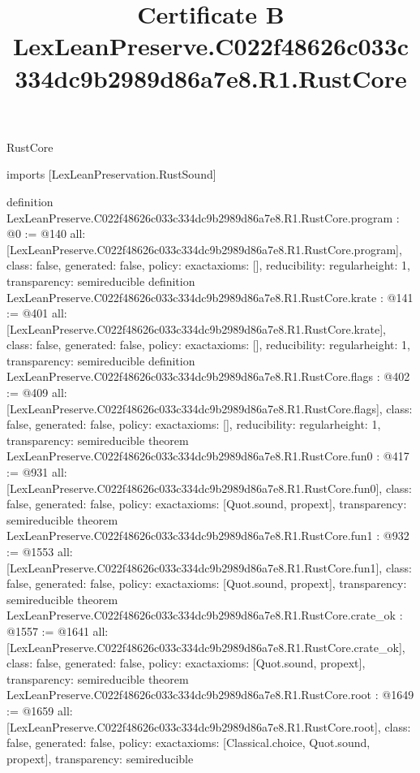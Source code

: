 \begin{lexlean}{RustCore}
\title{Certificate B LexLeanPreserve.C022f48626c033c334dc9b2989d86a7e8.R1.RustCore}
\begin{coremodule}
imports [LexLeanPreservation.RustSound]

definition LexLeanPreserve.C022f48626c033c334dc9b2989d86a7e8.R1.RustCore.program : @0 := @140 {
  all: [LexLeanPreserve.C022f48626c033c334dc9b2989d86a7e8.R1.RustCore.program],
  class: false,
  generated: false,
  policy: exact{axioms: []},
  reducibility: regular{height: 1},
  transparency: semireducible
}
definition LexLeanPreserve.C022f48626c033c334dc9b2989d86a7e8.R1.RustCore.krate : @141 := @401 {
  all: [LexLeanPreserve.C022f48626c033c334dc9b2989d86a7e8.R1.RustCore.krate],
  class: false,
  generated: false,
  policy: exact{axioms: []},
  reducibility: regular{height: 1},
  transparency: semireducible
}
definition LexLeanPreserve.C022f48626c033c334dc9b2989d86a7e8.R1.RustCore.flags : @402 := @409 {
  all: [LexLeanPreserve.C022f48626c033c334dc9b2989d86a7e8.R1.RustCore.flags],
  class: false,
  generated: false,
  policy: exact{axioms: []},
  reducibility: regular{height: 1},
  transparency: semireducible
}
theorem LexLeanPreserve.C022f48626c033c334dc9b2989d86a7e8.R1.RustCore.fun0 : @417 := @931 {
  all: [LexLeanPreserve.C022f48626c033c334dc9b2989d86a7e8.R1.RustCore.fun0],
  class: false,
  generated: false,
  policy: exact{axioms: [Quot.sound, propext]},
  transparency: semireducible
}
theorem LexLeanPreserve.C022f48626c033c334dc9b2989d86a7e8.R1.RustCore.fun1 : @932 := @1553 {
  all: [LexLeanPreserve.C022f48626c033c334dc9b2989d86a7e8.R1.RustCore.fun1],
  class: false,
  generated: false,
  policy: exact{axioms: [Quot.sound, propext]},
  transparency: semireducible
}
theorem LexLeanPreserve.C022f48626c033c334dc9b2989d86a7e8.R1.RustCore.crate_ok : @1557 := @1641 {
  all: [LexLeanPreserve.C022f48626c033c334dc9b2989d86a7e8.R1.RustCore.crate_ok],
  class: false,
  generated: false,
  policy: exact{axioms: [Quot.sound, propext]},
  transparency: semireducible
}
theorem LexLeanPreserve.C022f48626c033c334dc9b2989d86a7e8.R1.RustCore.root : @1649 := @1659 {
  all: [LexLeanPreserve.C022f48626c033c334dc9b2989d86a7e8.R1.RustCore.root],
  class: false,
  generated: false,
  policy: exact{axioms: [Classical.choice, Quot.sound, propext]},
  transparency: semireducible
}


\end{coremodule}
\end{lexlean}
